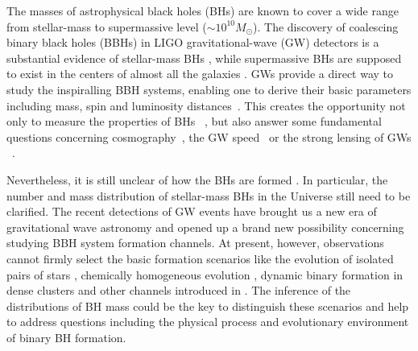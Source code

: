 \documentclass[twocolumn]{aastex62}
\newcommand{\kai}[1]{\textcolor{red}{[{\bf Kai}: #1]}}
\begin{document}
The masses of astrophysical black holes (BHs) are known to cover a wide range from stellar-mass to supermassive level ($\sim10^{10} M_{\odot}$). The discovery of 
coalescing binary black holes (BBHs) in LIGO gravitational-wave (GW) detectors is a substantial evidence of stellar-mass BHs \citep{Abbott2016}, while supermassive BHs are supposed to exist in the centers of almost all the galaxies \citep{Lynden-Bell1969, Kormendy1995}. 
GWs provide a direct way to study the inspiralling BBH systems, enabling one to derive their basic parameters including mass, spin and luminosity distances~\citep{Abbott2017phy, Abbott2018}. This creates the opportunity not only to measure the properties of BHs ~\citep{Abbott2018b}, but also answer some fundamental questions concerning cosmography~\citep{Liao2017, Ding2019, Cai2017}, the GW speed~\citep{Fan2017, Collett2017} or the strong lensing of GWs ~\citep{Ola2013, Biesiada2014, Ding2015}. %

Nevertheless, it is still unclear of how the BHs are formed \citep{Fryer1999, Fryer2001, Mirabel2016}. In particular, the number and mass distribution of stellar-mass BHs in the Universe still need to be clarified.
The recent detections of GW events have brought us a new era of gravitational wave astronomy \citep[e.g.,][]{Abbott2016, Abbott2016_sum, Abbott2018} and opened up a  brand new possibility concerning studying BBH system formation channels. 
At present, however, observations cannot firmly select the basic formation scenarios like the evolution of isolated pairs of stars \citep{Bethe1998, Portegies1998}, chemically homogeneous evolution \citep{Marchant2016, deMink2016}, dynamic binary formation in dense clusters \citep{Portegies2000, Kulkarni1993} and other channels introduced in \citet{Abbott2018b}.
The inference of the distributions of BH mass could be the key to distinguish these scenarios and help to address questions including the physical process and evolutionary environment of binary BH formation.
\end{document}
